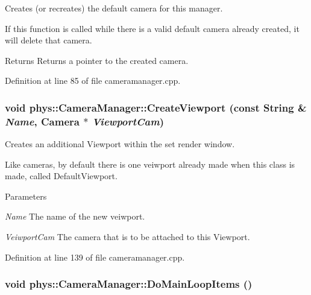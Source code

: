 Creates (or recreates) the default camera for this manager. 

If this function is called while there is a valid default camera already created, it will delete that camera. \begin{DoxyReturn}{Returns}
Returns a pointer to the created camera. 
\end{DoxyReturn}


Definition at line 85 of file cameramanager.cpp.

\hypertarget{classphys_1_1CameraManager_a99deb0e895ad703651b0ea6c933a0727}{
\subsubsection[{CreateViewport}]{\setlength{\rightskip}{0pt plus 5cm}void phys::CameraManager::CreateViewport (const {\bf String} \& {\em Name}, \/  {\bf Camera} $\ast$ {\em ViewportCam})}}
\label{d9/d91/classphys_1_1CameraManager_a99deb0e895ad703651b0ea6c933a0727}


Creates an additional Viewport within the set render window. 

Like cameras, by default there is one veiwport already made when this class is made, called DefaultViewport. 
\begin{DoxyParams}{Parameters}
\item[{\em Name}]The name of the new veiwport. \item[{\em VeiwportCam}]The camera that is to be attached to this Viewport. \end{DoxyParams}


Definition at line 139 of file cameramanager.cpp.

\hypertarget{classphys_1_1CameraManager_aaae22266bccc43f6efa66d2735d7d1d3}{
\subsubsection[{DoMainLoopItems}]{\setlength{\rightskip}{0pt plus 5cm}void phys::CameraManager::DoMainLoopItems ()}}
\label{d9/d91/classphys_1_1CameraManager_aaae22266bccc43f6efa66d2735d7d1d3}


